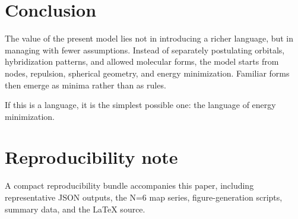 \documentclass[11pt,a4paper]{article}
\begin{document}


\section{Conclusion}
The value of the present model lies not in introducing a richer language, but in managing with fewer assumptions. Instead of separately postulating orbitals, hybridization patterns, and allowed molecular forms, the model starts from nodes, repulsion, spherical geometry, and energy minimization. Familiar forms then emerge as minima rather than as rules.

If this is a language, it is the simplest possible one: the language of energy minimization.

\section*{Reproducibility note}
A compact reproducibility bundle accompanies this paper, including representative JSON outputs, the N=6 map series, figure-generation scripts, summary data, and the LaTeX source.
\end{document}
